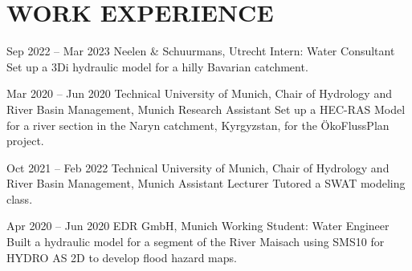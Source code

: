 









\section{WORK EXPERIENCE}




\jobentry
	{Sep 2022 -- Mar 2023} %
	{} %
	{Neelen \& Schuurmans, Utrecht} %
	{Intern: Water Consultant} %
	{Set up a 3Di hydraulic model for a hilly Bavarian catchment.} %

\jobentry
	{Mar 2020 -- Jun 2020} %
	{} %
	{Technical University of Munich, Chair of Hydrology and River Basin Management, Munich} %
	{Research Assistant} %
	{Set up a HEC-RAS Model for a river section in the Naryn catchment, Kyrgyzstan, for the ÖkoFlussPlan project.} %

\jobentry
	{Oct 2021 -- Feb 2022} %
	{} %
	{Technical University of Munich, Chair of Hydrology and River Basin Management, Munich} %
	{Assistant Lecturer} %
	{Tutored a SWAT modeling class.} %

\jobentry
	{Apr 2020 -- Jun 2020} %
	{} %
	{EDR GmbH, Munich} %
	{Working Student: Water Engineer} %
	{Built a hydraulic model for a segment of the River Maisach using SMS10 for HYDRO AS 2D to develop flood hazard maps.} %

